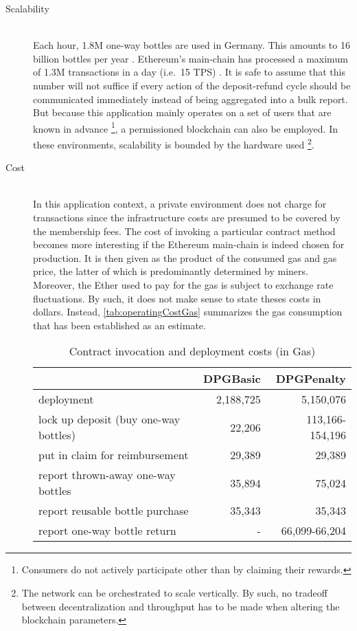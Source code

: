 \begin{description}
	\item[Scalability]
	\hfill \\
	Each hour, 1.8M one-way bottles are used in Germany. This amounts to 16 billion bottles per year \cite{DUHEinweg}. Ethereum's main-chain has processed a maximum of 1.3M transactions in a day (i.e.~15 TPS) \cite{etherscan}. It is safe to assume that this number will not suffice if every action of the deposit-refund cycle should be communicated immediately instead of being aggregated into a bulk report. But because this application mainly operates on a set of users that are known in advance \footnote{Consumers do not actively participate other than by claiming their rewards.}, a permissioned blockchain can also be employed. In these environments, scalability is bounded by the hardware used \footnote{The network can be orchestrated to scale vertically. By such, no tradeoff between decentralization and throughput has to be made when altering the blockchain parameters.}. 
	
	\item[Cost]
	\hfill \\
	In this application context, a private environment does not charge for transactions since the infrastructure costs are presumed to be covered by the membership fees. The cost of invoking a particular contract method becomes more interesting if the Ethereum main-chain is indeed chosen for production. It is then given as the product of the consumed gas and gas price, the latter of which is predominantly determined by miners. Moreover, the Ether used to pay for the gas is subject to exchange rate fluctuations. By such, it does not make sense to state theses costs in dollars. Instead, \autoref{tab:operatingCostGas} summarizes the gas consumption that has been established as an estimate.

	\begin{table}[hbt]
	\centering	
	\begin{tabular}{l|r|r}
    	& DPGBasic & DPGPenalty \\
    	\hline
    	deployment & 2,188,725 & 5,150,076 \\
    	\hline
    	lock up deposit (buy one-way bottles) & 22,206 & 113,166-154,196 \\ 
    	put in claim for reimbursement & 29,389 & 29,389 \\
    	report thrown-away one-way bottles & 35,894 & 75,024 \\
    	report reusable bottle purchase & 35,343 & 35,343 \\
    	\hline
    	report one-way bottle return & - & 66,099-66,204 \\
	\end{tabular}
	\caption[Contract invocation and deployment costs (in Gas)]{Contract invocation and deployment costs (in Gas) \footnotemark}
	\label{tab:operatingCostGas}
	\end{table}
	
	\FloatBarrier

\end{description}
  
